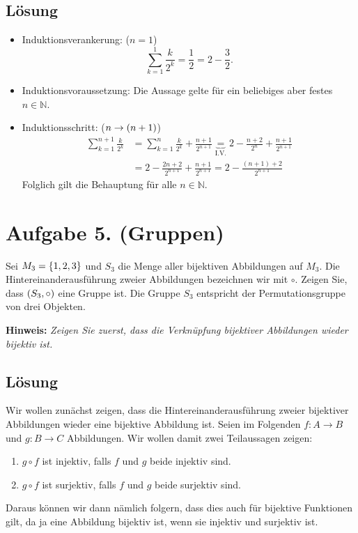 \documentclass[german,12pt]{homework}
\newcommand{\NN}{\mathbb{N}}
\DeclarePairedDelimiter{\enbrace}{(}{)}
\DeclarePairedDelimiter{\penbrace}{\{}{\}}
\begin{document}
    \subsection*{Lösung}
    \begin{itemize}
        \item Induktionsverankerung: (\(n = 1\))
        \[\sum_{k = 1}^1\frac{k}{2^k} = \frac{1}{2} = 2 - \frac{3}{2}.\]
        \item Induktionsvoraussetzung: Die Aussage gelte für ein beliebiges
        aber festes \(n \in \NN\).
        \item Induktionsschritt: (\(n \to \enbrace*{n + 1}\))
        \begin{align*}
            \sum_{k = 1}^{n + 1}\frac{k}{2^k} &= \sum_{k = 1}^{n}\frac{k}{2^k}
            + \frac{n + 1}{2^{n + 1}} \underbrace{=}_\text{I.V.} 2 - \frac{n +
            2}{2^n} + \frac{n + 1}{2^{n + 1}}\\
            &= 2 - \frac{2n + 2}{2^{n + 1}} + \frac{n + 1}{2^{n + 1}} = 2 -
            \frac{(n + 1) + 2}{2^{n + 1}}
        \end{align*}
        Folglich gilt die Behauptung für alle \(n \in \NN\).
    \end{itemize}

    \section*{Aufgabe 5. (Gruppen)}

    \begin{problem}
        Sei \(M_3 = \penbrace*{1, 2, 3}\) und \(S_3\) die Menge aller
        bijektiven Abbildungen auf \(M_3\). Die Hintereinanderausführung zweier
        Abbildungen bezeichnen wir mit \(\circ\). Zeigen Sie, dass
        \(\enbrace*{S_3, \circ}\) eine Gruppe ist. Die Gruppe \(S_3\)
        entspricht der Permutationsgruppe von drei Objekten.

        \textbf{Hinweis:} \quad \emph{Zeigen Sie zuerst, dass die Verknüpfung
        bijektiver Abbildungen wieder bijektiv ist.}
    \end{problem}

    \subsection*{Lösung}
    Wir wollen zunächst zeigen, dass die Hintereinanderausführung zweier
    bijektiver Abbildungen wieder eine bijektive Abbildung ist. Seien im
    Folgenden \(f: A \to B\) und \(g: B \to C\) Abbildungen. Wir wollen damit
    zwei Teilaussagen zeigen:
    \begin{enumerate}
        \item \(g \circ f\) ist injektiv, falls \(f\) und \(g\) beide injektiv
        sind.
        \item \(g \circ f\) ist surjektiv, falls \(f\) und \(g\) beide
        surjektiv sind.
    \end{enumerate}
    Daraus können wir dann nämlich folgern, dass dies auch für bijektive
    Funktionen gilt, da ja eine Abbildung bijektiv ist, wenn sie injektiv und
    surjektiv ist.
\end{document}
